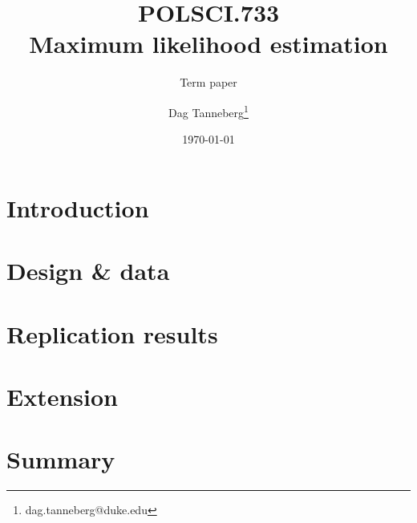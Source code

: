 \documentclass[parskip=half]{scrartcl}\usepackage[]{graphicx}\usepackage[]{color}
\title{POLSCI.733\\Maximum likelihood estimation}
\subtitle{Term paper}
\author{Dag Tanneberg\thanks{%
    dag.tanneberg@duke.edu
  }
}
\date{\today}
\begin{document}
 
\linenumbers

\maketitle
\thispagestyle{empty}
\tableofcontents
\newpage

\section{Introduction}








\section{Design \& data}






\section{Replication results}
%
%




\section{Extension}



\section{Summary}


\printbibliography
\newpage
\end{document}
